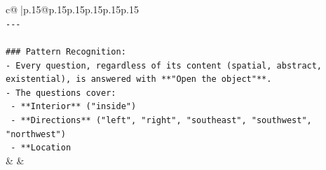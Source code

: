 \documentclass{article}
\begin{document}
{\begin{supertabular}{c@{$\;$}|p{.15\linewidth}@{}p{.15\linewidth}p{.15\linewidth}p{.15\linewidth}p{.15\linewidth}p{.15\linewidth}}
{{{\\ 
\texttt{{-}{-}{-}} \\
\\ 
\texttt{\#\#\# Pattern Recognition:} \\
\texttt{{-} Every question, regardless of its content (spatial, abstract, existential), is answered with **"Open the object"**.} \\
\texttt{{-} The questions cover:} \\
\texttt{  {-} **Interior** ("inside")} \\
\texttt{  {-} **Directions** ("left", "right", "southeast", "southwest", "northwest")} \\
\texttt{  {-} **Location} \\
            }
        }
    }
    & & \\ \\


\end{supertabular}}
\end{document}

